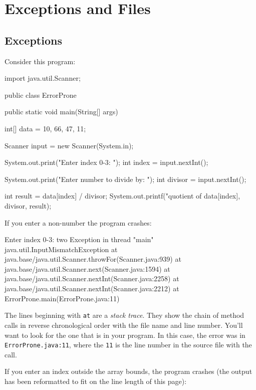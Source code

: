 \chapter{Exceptions and Files}

\section{Exceptions}

Consider this program:

\begin{code}
import java.util.Scanner;

public class ErrorProne {

    public static void main(String[] args) {
        int[] data = {10, 66, 47, 11};
        
        Scanner input = new Scanner(System.in);
        
        System.out.print("Enter index 0-3: ");
        int index = input.nextInt();
        
        System.out.print("Enter number to divide by: ");
        int divisor = input.nextInt();
        
        int result = data[index] / divisor;
        System.out.printf("quotient of %
            data[index], divisor, result);
    }
}
\end{code}

If you enter a non-number the program crashes:

\begin{stdout}
Enter index 0-3: two
Exception in thread "main" java.util.InputMismatchException
	at java.base/java.util.Scanner.throwFor(Scanner.java:939)
	at java.base/java.util.Scanner.next(Scanner.java:1594)
	at java.base/java.util.Scanner.nextInt(Scanner.java:2258)
	at java.base/java.util.Scanner.nextInt(Scanner.java:2212)
	at ErrorProne.main(ErrorProne.java:11)
\end{stdout}
The lines beginning with \texttt{at} are a {\em stack trace}. They show the chain of method calls in reverse chronological order with the file name and line number. You'll want to look for the one that is in your program. In this case, the error was in \texttt{ErrorProne.java:11}, where the \texttt{11} is the line number in the source file with the  call.

If you enter an index outside the array bounds, the program crashes (the output has been reformatted to fit on the line length of this page):

